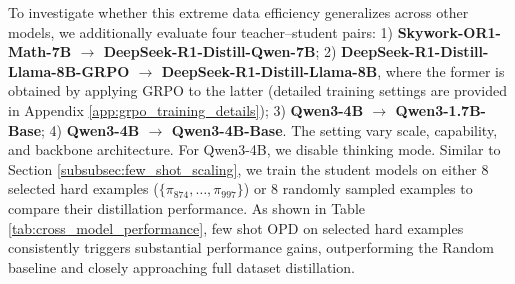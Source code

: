 To investigate whether this extreme data efficiency generalizes across other models, we additionally evaluate four teacher–student pairs: 1) \textbf{Skywork-OR1-Math-7B $\rightarrow$ DeepSeek-R1-Distill-Qwen-7B}; 2) \textbf{DeepSeek-R1-Distill-Llama-8B-GRPO $\rightarrow$ DeepSeek-R1-Distill-Llama-8B}, where the former is obtained by applying GRPO to the latter (detailed training settings are provided in Appendix \ref{app:grpo_training_details}); 3) \textbf{Qwen3-4B $\rightarrow$ Qwen3-1.7B-Base}; 4) \textbf{Qwen3-4B $\rightarrow$ Qwen3-4B-Base}. The setting vary scale, capability, and backbone architecture. For Qwen3-4B, we disable thinking mode. Similar to Section \ref{subsubsec:few_shot_scaling}, we train the student models on either 8 selected hard examples ($\{\pi_{874}, \dots, \pi_{997}\}$) or 8 randomly sampled examples to compare their distillation performance. 
As shown in Table \ref{tab:cross_model_performance}, few shot OPD on selected hard examples consistently triggers substantial performance gains, outperforming the Random baseline and closely approaching full dataset distillation.


